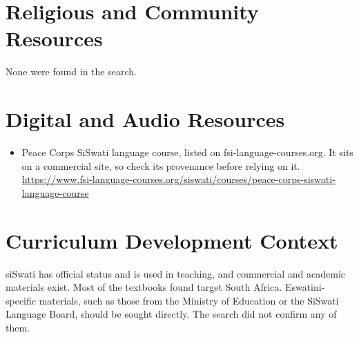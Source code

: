 \documentclass[12pt]{article}
\begin{document}
\section{Religious and Community Resources}
None were found in the search.

\section{Digital and Audio Resources}
\begin{itemize}
\item Peace Corps SiSwati language course, listed on fsi-language-courses.org. It sits on a commercial site, so check its provenance before relying on it. \url{https://www.fsi-language-courses.org/siswati/courses/peace-corps-siswati-language-course}
\end{itemize}

\section{Curriculum Development Context}
siSwati has official status and is used in teaching, and commercial and academic materials exist. Most of the textbooks found target South Africa. Eswatini-specific materials, such as those from the Ministry of Education or the SiSwati Language Board, should be sought directly. The search did not confirm any of them.
\end{document}
